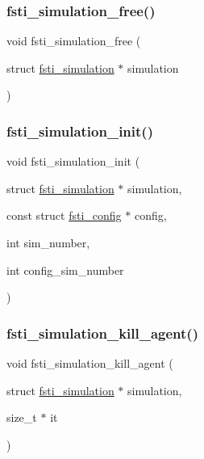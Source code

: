 \subsubsection{\texorpdfstring{fsti\+\_\+simulation\+\_\+free()}{fsti\_simulation\_free()}}
{\footnotesize\ttfamily void fsti\+\_\+simulation\+\_\+free (\begin{DoxyParamCaption}\item[{struct \mbox{\hyperlink{structfsti__simulation}{fsti\+\_\+simulation}} $\ast$}]{simulation }\end{DoxyParamCaption})}

\mbox{\label{fsti-simulation_8c_a5e7080c9230e123dc212cc19bb209487}} 
\subsubsection{\texorpdfstring{fsti\+\_\+simulation\+\_\+init()}{fsti\_simulation\_init()}}
{\footnotesize\ttfamily void fsti\+\_\+simulation\+\_\+init (\begin{DoxyParamCaption}\item[{struct \mbox{\hyperlink{structfsti__simulation}{fsti\+\_\+simulation}} $\ast$}]{simulation,  }\item[{const struct \mbox{\hyperlink{structfsti__config}{fsti\+\_\+config}} $\ast$}]{config,  }\item[{int}]{sim\+\_\+number,  }\item[{int}]{config\+\_\+sim\+\_\+number }\end{DoxyParamCaption})}

\mbox{\label{fsti-simulation_8c_a9d76145c517a59cb16affaf38f6da235}} 
\subsubsection{\texorpdfstring{fsti\+\_\+simulation\+\_\+kill\+\_\+agent()}{fsti\_simulation\_kill\_agent()}}
{\footnotesize\ttfamily void fsti\+\_\+simulation\+\_\+kill\+\_\+agent (\begin{DoxyParamCaption}\item[{struct \mbox{\hyperlink{structfsti__simulation}{fsti\+\_\+simulation}} $\ast$}]{simulation,  }\item[{size\+\_\+t $\ast$}]{it }\end{DoxyParamCaption})}

